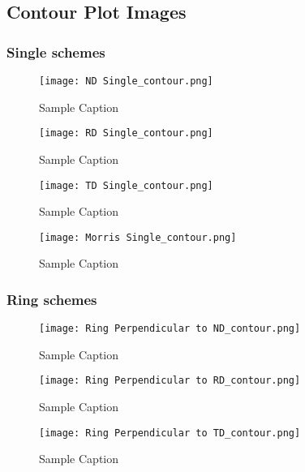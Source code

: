 \documentclass{article}
\begin{document}
\subsection{Contour Plot Images}

\subsubsection{Single schemes}
\begin{figure}[ht]
    \centering
    \texttt{[image: ND Single\_contour.png]}
    \caption{Sample Caption}
\end{figure}

\begin{figure}[ht]
    \centering
    \texttt{[image: RD Single\_contour.png]}
    \caption{Sample Caption}
\end{figure}

\begin{figure}[ht]
    \centering
    \texttt{[image: TD Single\_contour.png]}
    \caption{Sample Caption}
\end{figure}




\begin{figure}[ht]
    \centering
    \texttt{[image: Morris Single\_contour.png]}
    \caption{Sample Caption}
\end{figure}


\subsubsection{Ring schemes}
\begin{figure}[ht]
    \centering
    \texttt{[image: Ring Perpendicular to ND\_contour.png]}
    \caption{Sample Caption}
\end{figure}

\begin{figure}[ht]
    \centering
    \texttt{[image: Ring Perpendicular to RD\_contour.png]}
    \caption{Sample Caption}
\end{figure}

\begin{figure}[ht]
    \centering
    \texttt{[image: Ring Perpendicular to TD\_contour.png]}
    \caption{Sample Caption}
\end{figure}
\end{document}
